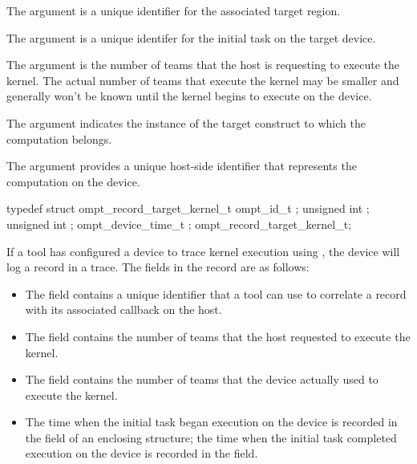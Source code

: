 \argdesc

The argument  is a unique identifier for the
associated target region.

The argument  is a unique identifer for the
initial task on the target device.

The argument  is the number of teams that the host is requesting to
execute the kernel. The actual number of teams that execute the kernel may be smaller and generally won't be
known until the kernel begins to execute on the device.

\constraints

The argument  indicates the instance of the
target construct to which the computation belongs.

The argument  provides a unique host-side
identifier that represents the computation on the device.

\record

\begin{ccppspecific}
\begin{omptRecord}
typedef struct ompt_record_target_kernel_t {
  ompt_id_t ;
  unsigned int ;
  unsigned int ;
  ompt_device_time_t ;
} ompt_record_target_kernel_t;
\end{omptRecord}
\end{ccppspecific}



If a tool has configured a device to trace kernel execution using ,
the device will log a  record in a trace. The fields in the record
are as follows:

\begin{itemize}
\item The  field contains a unique identifier that a tool can use to correlate a
 record with its associated  callback
on the host.

\item The  field contains the number of teams that the host requested to execute the kernel.

\item The  field contains the number of teams that the device actually used to execute the kernel.

\item The time when the initial task began execution on the device is recorded in the  field of an enclosing
 structure; the time when the initial task completed execution on the device is recorded in the  field.
\end{itemize}

